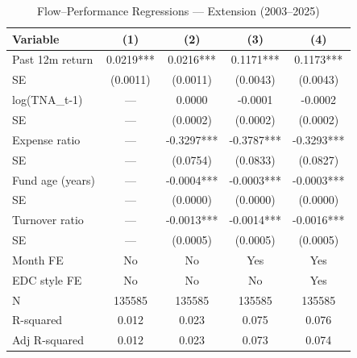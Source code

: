 \begin{table}[htbp]
\centering
\caption{Flow--Performance Regressions --- Extension (2003--2025)}
\label{tab:regression_extension}
\small
\begin{tabular}{lcccc}
\toprule
Variable & (1) & (2) & (3) & (4) \\
\midrule
Past 12m return & 0.0219*** & 0.0216*** & 0.1171*** & 0.1173*** \\
SE & (0.0011) & (0.0011) & (0.0043) & (0.0043) \\
log(TNA\_t-1) & — & 0.0000 & -0.0001 & -0.0002 \\
SE & — & (0.0002) & (0.0002) & (0.0002) \\
Expense ratio & — & -0.3297*** & -0.3787*** & -0.3293*** \\
SE & — & (0.0754) & (0.0833) & (0.0827) \\
Fund age (years) & — & -0.0004*** & -0.0003*** & -0.0003*** \\
SE & — & (0.0000) & (0.0000) & (0.0000) \\
Turnover ratio & — & -0.0013*** & -0.0014*** & -0.0016*** \\
SE & — & (0.0005) & (0.0005) & (0.0005) \\
Month FE & No & No & Yes & Yes \\
EDC style FE & No & No & No & Yes \\
N & 135585 & 135585 & 135585 & 135585 \\
R-squared & 0.012 & 0.023 & 0.075 & 0.076 \\
Adj R-squared & 0.012 & 0.023 & 0.073 & 0.074 \\
\bottomrule
\end{tabular}
\end{table}
